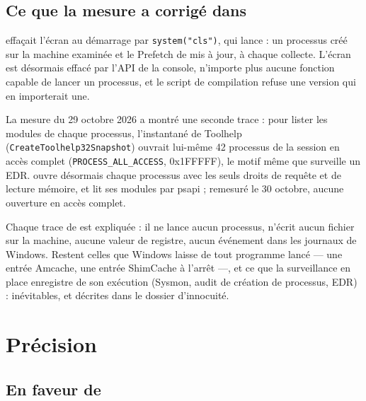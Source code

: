 \documentclass[11pt,a4paper,oneside]{report}
\begin{document}
\section{Ce que la mesure a corrigé dans \wac{}}

\wac{} effaçait l'écran au démarrage par \texttt{system("cls")}, qui lance
 : un processus créé sur la machine examinée et le Prefetch de
 mis à jour, à chaque collecte. L'écran est désormais effacé par
l'API de la console, \wac{} n'importe plus aucune fonction capable de lancer un
processus, et le script de compilation refuse une version qui en importerait
une.

La mesure du 29 octobre 2026 a montré une seconde trace : pour lister les
modules de chaque processus, l'instantané de Toolhelp
(\texttt{CreateToolhelp32Snapshot}) ouvrait lui-même 42 processus de la
session en accès complet (\texttt{PROCESS\_ALL\_ACCESS}, 0x1FFFFF), le motif
même que surveille un EDR. \wac{} ouvre désormais chaque processus avec les
seuls droits de requête et de lecture mémoire, et lit ses modules par psapi ;
remesuré le 30 octobre, aucune ouverture en accès complet.

\begin{note}
Chaque trace de \wac{} est expliquée : il ne lance aucun processus, n'écrit
aucun fichier sur la machine, aucune valeur de registre, aucun événement dans
les journaux de Windows. Restent celles que Windows laisse de tout programme
lancé --- une entrée Amcache, une entrée ShimCache à l'arrêt ---, et ce que la
surveillance en place enregistre de son exécution (Sysmon, audit de création
de processus, EDR) : inévitables, et décrites dans le dossier d'innocuité.
\end{note}

\chapter{Précision}\label{chap:precision}

\section{En faveur de \wac{}}
\end{document}
